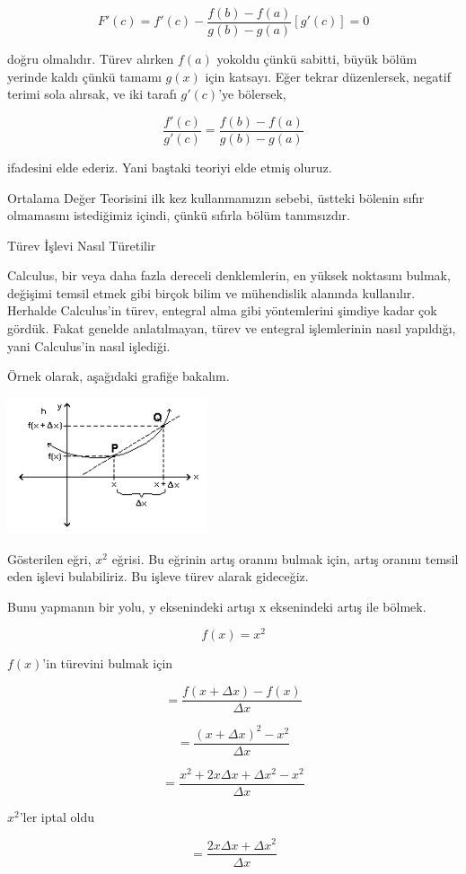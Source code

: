 \documentclass[12pt,fleqn]{article}\usepackage{../../common}
\begin{document}
$$ F'(c) = f'(c) - \frac{f(b)-f(a)}{g(b)-g(a)}[g'(c)] = 0$$

doğru olmalıdır. Türev alırken $f(a)$ yokoldu çünkü sabitti, büyük bölüm
yerinde kaldı çünkü tamamı $g(x)$ için katsayı. Eğer tekrar düzenlersek,
negatif terimi sola alırsak, ve iki tarafı $g'(c)$'ye bölersek,

$$ \frac{f'(c)}{g'(c)} = \frac{f(b)-f(a)}{g(b)-g(a)} $$

ifadesini elde ederiz. Yani baştaki teoriyi elde etmiş oluruz. 

Ortalama Değer Teorisini ilk kez kullanmamızın sebebi, üstteki bölenin sıfır
olmamasını istediğimiz içindi, çünkü sıfırla bölüm tanımsızdır. 

Türev İşlevi Nasıl Türetilir

Calculus, bir veya daha fazla dereceli denklemlerin, en yüksek noktasını
bulmak, değişimi temsil etmek gibi birçok bilim ve mühendislik alanında
kullanılır. Herhalde Calculus'in türev, entegral alma gibi yöntemlerini
şimdiye kadar çok gördük. Fakat genelde anlatılmayan, türev ve entegral
işlemlerinin nasıl yapıldığı, yani Calculus'in nasıl işlediği.

Örnek olarak, aşağıdaki grafiğe bakalım. 

\includegraphics[height=4cm]{ode_mattuck_93_diff_10.png}

Gösterilen eğri, $x^2$ eğrisi. Bu eğrinin artış oranını bulmak için, artış
oranını temsil eden işlevi bulabiliriz. Bu işleve türev alarak gideceğiz.

Bunu yapmanın bir yolu, y eksenindeki artışı x eksenindeki artış ile
bölmek. 

$$ f(x) = x^2 $$

$f(x)$'in türevini bulmak için 

$$ = \frac{f(x+\Delta x) - f(x)}{\Delta x} $$

$$ = \frac{(x+\Delta x)^2 - x^2}{\Delta x} $$

$$ = \frac{x^2 + 2x\Delta x + \Delta x^2 - x^2}{\Delta x} $$

$x^2$'ler iptal oldu

$$=  \frac{2x\Delta x + \Delta x^2}{\Delta x} $$
\end{document}
